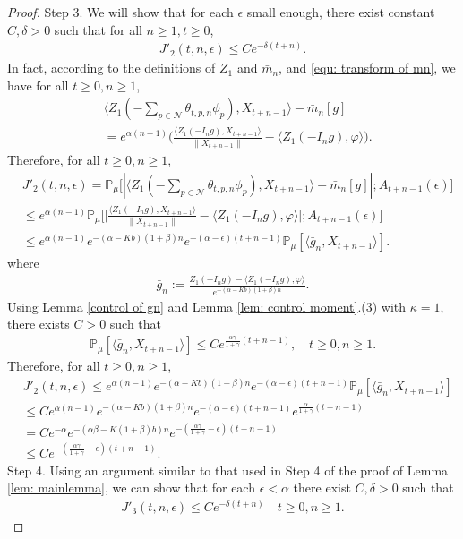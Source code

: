 \documentclass[12pt,a4paper]{amsart}
\theoremstyle{plain}
\theoremstyle{definition}
\numberwithin{equation}{section}
\begin{document}
\begin{proof}
Step 3.
	We will show that for each $\epsilon$ small enough, there exist constant $C,\delta>0$ such that for all $n\geq 1, t\geq 0$, 
\begin{align}
\label{eq:31step31}
    J'_2(t,n,\epsilon)
    \leq C e^{-\delta(t+n)}.
\end{align}
In fact, according to the definitions of $Z_1$ and $\bar{m}_n$, and \eqref{equ: transform of mn}, we have for all $t\geq 0, n\geq1$, 
\begin{align}
    &\langle Z_1(-\sum_{p\in \mathcal{N}}\theta_{t,p,n}\phi_p), X_{t+n-1}\rangle-\bar{m}_n[g]\\
    &=e^{\alpha(n-1)}\Big(\frac{\langle Z_1(-I_ng),X_{t+n-1}\rangle}{\|X_{t+n-1}\|}-\langle Z_1(-I_ng),\varphi\rangle\Big).
\end{align}
Therefore, for all $t\geq 0, n\geq1$, 
\begin{align}
    &J'_2(t,n,\epsilon)
	= \mathbb{P}_{\mu}\big[|\langle Z_1(-\sum_{p\in\mathcal{N}}\theta_{t,p,n}\phi_p),X_{t+n-1}\rangle-\bar{m}_n[g]|; A_{t+n-1}(\epsilon)\big]\\
	&\leq e^{\alpha(n-1)}\mathbb{P}_{\mu}\Big[\big|\frac{\langle Z_1(-I_ng),X_{t+n-1}\rangle}{\|X_{t+n-1}\|}-\langle Z_1(-I_ng),\varphi\rangle\big|;A_{t+n-1}(\epsilon)\Big]\\
	&\leq e^{\alpha(n-1)}e^{-(\alpha-Kb)(1+\beta)n}e^{-(\alpha-\epsilon)(t+n-1)}\mathbb{P}_{\mu}
[\langle \bar {g}_n, X_{t+n-1}\rangle].
\end{align}
where
\begin{align}
    \bar{g}_n:=\frac{Z_1(-I_ng)-\langle Z_1(-I_ng),\varphi\rangle}{e^{-(\alpha-Kb)(1+\beta)n}}.
\end{align}
Using Lemma \ref{control of gn} and Lemma \ref{lem: control moment}.(3) with $\kappa=1$,
 there exists $C>0$ such that
\begin{align}
    \mathbb{P}_{\mu}[\langle \bar{g}_n, X_{t+n-1}\rangle]\leq Ce^{\frac{\alpha \gamma}{1+\gamma}(t+n-1)},\quad t\geq0, n\geq 1.
\end{align}
Therefore, for all $t\geq 0, n\geq1$, 
\begin{align}
    &J'_2(t,n,\epsilon)\leq e^{\alpha(n-1)}e^{-(\alpha-Kb)(1+\beta)n}e^{-(\alpha-\epsilon)(t+n-1)}\mathbb{P}_{\mu}[\langle \bar{g}_n, X_{t+n-1}\rangle]\\
    &\leq C e^{\alpha(n-1)}e^{-(\alpha-Kb)(1+\beta)n}e^{-(\alpha-\epsilon)(t+n-1)}e^{\frac{\alpha }{1+\gamma}(t+n-1)}\\
    &=Ce^{-\alpha}e^{-(\alpha\beta-K(1+\beta)b)n}e^{-(\frac{\alpha\gamma}{1+\gamma}-\epsilon)(t+n-1)}\\&\leq Ce^{-(\frac{\alpha\gamma}{1+\gamma}-\epsilon)(t+n-1)}.
\end{align}
	Step 4. Using an argument similar to that used in Step 4 of the proof of  Lemma \ref{lem: mainlemma}, we can show that for each $\epsilon< \alpha$ there exist $C,\delta>0$ such that
\begin{align}\label{ineq: control of J31}
    J'_3(t,n,\epsilon)\leq Ce^{-\delta (t+n)}\quad t\geq0, n\geq 1.
\end{align}


\end{proof}
\end{document}
